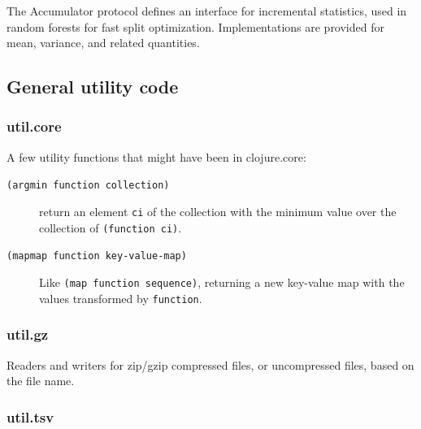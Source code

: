 \documentclass[10pt,openany]{article}
\numberwithin{definition}{section}
\numberwithin{example}{section}
\numberwithin{equation}{section}
\numberwithin{figure}{section}
\begin{document}
The Accumulator protocol defines an interface for incremental statistics,
used in random forests for fast split optimization. Implementations
are provided for mean, variance, and related quantities.


\subsection{General utility code}


\subsubsection{util.core}

A few utility functions that might have been in clojure.core:
\begin{description}
\item [{\texttt{(argmin~function~collection)}}] return an element \texttt{ci}
of the collection with the minimum value over the collection of \texttt{(function~ci)}.
\item [{\texttt{(mapmap~function~key-value-map)}}] Like \texttt{(map~function~sequence)},
returning a new key-value map with the values transformed by \texttt{function}. 
\end{description}

\subsubsection{util.gz}

Readers and writers for zip/gzip compressed files, or uncompressed
files, based on the file name.


\subsubsection{\label{sub:util.tsv}util.tsv}
\end{document}
